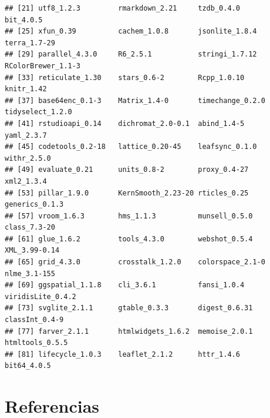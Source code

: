 \documentclass[spanish]{article}
\begin{document}
\begin{verbatim}
## [21] utf8_1.2.3         rmarkdown_2.21     tzdb_0.4.0         bit_4.0.5         
## [25] xfun_0.39          cachem_1.0.8       jsonlite_1.8.4     terra_1.7-29      
## [29] parallel_4.3.0     R6_2.5.1           stringi_1.7.12     RColorBrewer_1.1-3
## [33] reticulate_1.30    stars_0.6-2        Rcpp_1.0.10        knitr_1.42        
## [37] base64enc_0.1-3    Matrix_1.4-0       timechange_0.2.0   tidyselect_1.2.0  
## [41] rstudioapi_0.14    dichromat_2.0-0.1  abind_1.4-5        yaml_2.3.7        
## [45] codetools_0.2-18   lattice_0.20-45    leafsync_0.1.0     withr_2.5.0       
## [49] evaluate_0.21      units_0.8-2        proxy_0.4-27       xml2_1.3.4        
## [53] pillar_1.9.0       KernSmooth_2.23-20 rticles_0.25       generics_0.1.3    
## [57] vroom_1.6.3        hms_1.1.3          munsell_0.5.0      class_7.3-20      
## [61] glue_1.6.2         tools_4.3.0        webshot_0.5.4      XML_3.99-0.14     
## [65] grid_4.3.0         crosstalk_1.2.0    colorspace_2.1-0   nlme_3.1-155      
## [69] ggspatial_1.1.8    cli_3.6.1          fansi_1.0.4        viridisLite_0.4.2 
## [73] svglite_2.1.1      gtable_0.3.3       digest_0.6.31      classInt_0.4-9    
## [77] farver_2.1.1       htmlwidgets_1.6.2  memoise_2.0.1      htmltools_0.5.5   
## [81] lifecycle_1.0.3    leaflet_2.1.2      httr_1.4.6         bit64_4.0.5
\end{verbatim}

\hypertarget{referencias}{%
\section*{Referencias}\label{referencias}}
\end{document}
